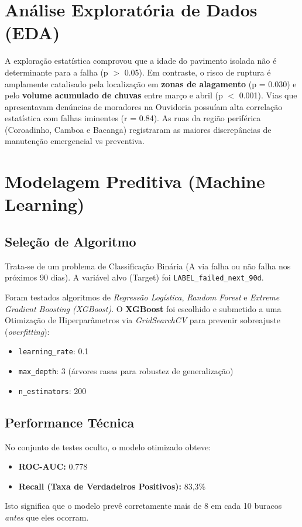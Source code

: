 \documentclass[12pt,a4paper]{article}
\begin{document}
\section{Análise Exploratória de Dados (EDA)}
A exploração estatística comprovou que a idade do pavimento isolada não é determinante para a falha (p $>$ 0.05). Em contraste, o risco de ruptura é amplamente catalisado pela localização em \textbf{zonas de alagamento} (p = 0.030) e pelo \textbf{volume acumulado de chuvas} entre março e abril (p $<$ 0.001).
Vias que apresentavam denúncias de moradores na Ouvidoria possuíam alta correlação estatística com falhas iminentes (r = 0.84). As ruas da região periférica (Coroadinho, Camboa e Bacanga) registraram as maiores discrepâncias de manutenção emergencial vs preventiva.

\section{Modelagem Preditiva (Machine Learning)}
\subsection{Seleção de Algoritmo}
Trata-se de um problema de Classificação Binária (A via falha ou não falha nos próximos 90 dias). A variável alvo (Target) foi \texttt{LABEL\_failed\_next\_90d}.

Foram testados algoritmos de \textit{Regressão Logística}, \textit{Random Forest} e \textit{Extreme Gradient Boosting (XGBoost)}. O \textbf{XGBoost} foi escolhido e submetido a uma Otimização de Hiperparâmetros via \textit{GridSearchCV} para prevenir sobreajuste (\textit{overfitting}):
\begin{itemize}
    \item \texttt{learning\_rate}: 0.1
    \item \texttt{max\_depth}: 3 (árvores rasas para robustez de generalização)
    \item \texttt{n\_estimators}: 200
\end{itemize}

\subsection{Performance Técnica}
No conjunto de testes oculto, o modelo otimizado obteve:
\begin{itemize}
    \item \textbf{ROC-AUC:} 0.778
    \item \textbf{Recall (Taxa de Verdadeiros Positivos):} 83,3\%
\end{itemize}
Isto significa que o modelo prevê corretamente mais de 8 em cada 10 buracos \textit{antes} que eles ocorram. 
\end{document}
